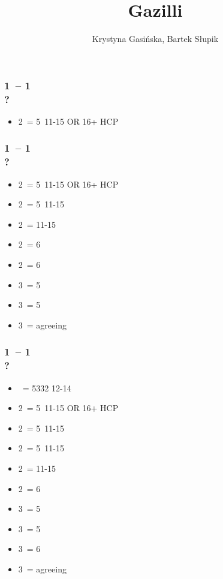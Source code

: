 \documentclass[12pt, a4paper]{article}
\title{Gazilli}
\author{Krystyna Gasińska, Bartek Słupik}
\begin{document}
\maketitle


\subsubsection*{1\hearts\ -- 1\spades\ \\ ?}
\begin{itemize}
    \item 2\clubs\ = 5\hearts\clubs\ 11-15 OR 16+ HCP \fonce
\end{itemize}

\subsubsection*{1\hearts\ -- 1\ntx\ \\ ?}
\begin{itemize}
    \item 2\clubs\ = 5\hearts\clubs\ 11-15 OR 16+ HCP \fonce
    \item 2\diams\ = 5\diams\ 11-15
    \item 2\hearts\ = 11-15
    \item 2\spades\ = 6\spades\ \gf
    \item 2\ntx\ = 6\minor\ \gf
    \item 3\clubs\ = 5\clubs\ \gf
    \item 3\diams\ = 5\diams\ \gf
    \item 3\hearts\ = agreeing \hearts\ \gf
\end{itemize}

\subsubsection*{1\spades\ -- 1\ntx\ \\ ?}
\begin{itemize}
    \item \pass\ = 5332 12-14
    \item 2\clubs\ = 5\spades\clubs\ 11-15 OR 16+ HCP \fonce
    \item 2\diams\ = 5\diams\ 11-15
    \item 2\hearts\ = 5\hearts\ 11-15
    \item 2\spades\ = 11-15
    \item 2\ntx\ = 6\minor\ \gf
    \item 3\clubs\ = 5\clubs\ \gf
    \item 3\diams\ = 5\diams\ \gf
    \item 3\hearts\ = 6\hearts\ \gf
    \item 3\spades\ = agreeing \spades\ \gf
\end{itemize}
\end{document}
